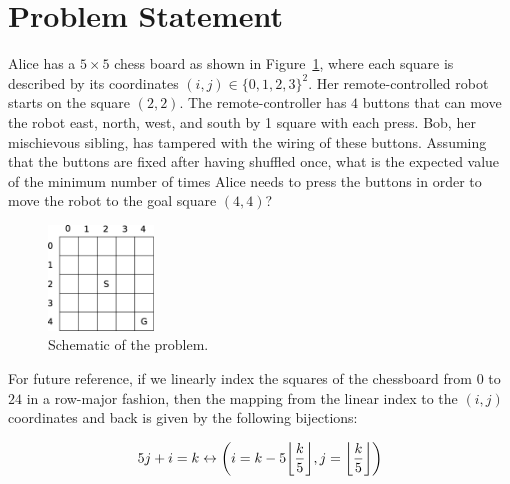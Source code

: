 \section{Problem Statement}
\label{sec:problem}
%
Alice has a $5 \times 5$ chess board as shown in Figure~\ref{fig:problem}, where
each square is described by its coordinates $(i, j) \in \{0, 1, 2, 3\}^2$. Her
remote-controlled robot starts on the square $(2,2)$. The remote-controller has
$4$ buttons that can move the robot east, north, west, and south by 1 square
with each press. Bob, her mischievous sibling, has tampered with the wiring of
these buttons. Assuming that the buttons are fixed after having shuffled once,
what is the expected value of the minimum number of times Alice needs to press
the buttons in order to move the robot to the goal square $(4,4)$?

\begin{figure}[bth]
    \centering
    \includegraphics[width=0.25\textwidth]{./figures/drawing_v1.eps}
    \caption{Schematic of the problem.}
    \label{fig:problem}
\end{figure}

For future reference, if we linearly index the squares of the chessboard from 
$0$ to $24$ in a row-major fashion, then the mapping from the linear index to
the $(i, j)$ coordinates and back is given by the following bijections:

\begin{equation}
5j + i = k \leftrightarrow \left(i = k - 5 \floor*{\frac{k}{5}}, j = \floor*{\frac{k}{5}}\right) 
\label{eq:bijection}
\end{equation}
